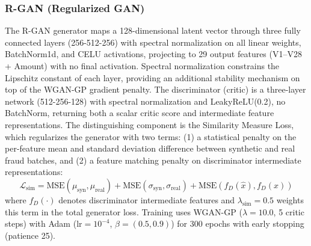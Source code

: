 \documentclass[conference]{IEEEtran}
\begin{document}
\subsubsection{R-GAN (Regularized GAN)}

The R-GAN generator maps a 128-dimensional latent vector through three
fully connected layers (256-512-256) with spectral normalization on all
linear weights, BatchNorm1d, and CELU activations, projecting to 29 output
features (V1--V28 + Amount) with no final activation. Spectral normalization
constrains the Lipschitz constant of each layer, providing an additional
stability mechanism on top of the WGAN-GP gradient penalty. The discriminator
(critic) is a three-layer network (512-256-128) with spectral normalization
and LeakyReLU(0.2), no BatchNorm, returning both a scalar critic score and
intermediate feature representations. The distinguishing component is the
Similarity Measure Loss, which regularizes the generator with two terms:
(1) a statistical penalty on the per-feature mean and standard deviation
difference between synthetic and real fraud batches, and (2) a feature
matching penalty on discriminator intermediate representations:
\begin{equation}
\mathcal{L}_\text{sim} = \text{MSE}(\mu_\text{syn}, \mu_\text{real})
  + \text{MSE}(\sigma_\text{syn}, \sigma_\text{real})
  + \text{MSE}(f_D(\hat{x}), f_D(x))
\end{equation}
where $f_D(\cdot)$ denotes discriminator intermediate features and
$\lambda_\text{sim}=0.5$ weights this term in the total generator loss.
Training uses WGAN-GP ($\lambda=10.0$, 5 critic steps) with Adam
($\text{lr}=10^{-4}$, $\beta=(0.5, 0.9)$) for 300 epochs with early
stopping (patience 25).
\end{document}
